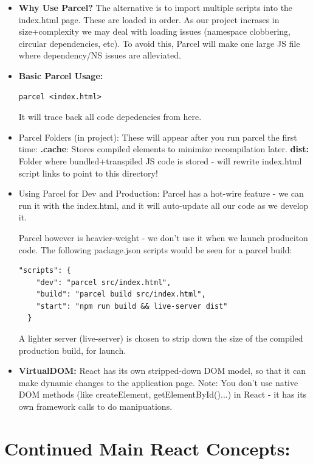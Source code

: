 \documentclass[8pt,a4paper]{extarticle}
\begin{document}
\begin{itemize}
\item \textbf{Why Use Parcel?} The alternative is to import multiple scripts into the index.html page. These are loaded in order. As our project incrases in size+complexity we may deal with loading issues (namespace clobbering, circular dependencies, etc). To avoid this, Parcel will make one large JS file where dependency/NS issues are alleviated.

\item \textbf{Basic Parcel Usage:}

\begin{verbatim}
parcel <index.html>
\end{verbatim}

It will trace back all code depedencies from here.
 
\item Parcel Folders (in project): These will appear after you run parcel the first time:
\mitem \textbf{.cache}: Stores compiled elements to minimize recompilation later.
\mitem \textbf{dist:} Folder where bundled+transpiled JS code is stored - will rewrite index.html script links to point to this directory!
\item Using Parcel for Dev and Production: Parcel has a hot-wire feature - we can run it with the index.html, and it will auto-update all our code as we develop it.

Parcel however is heavier-weight - we don't use it when we launch produciton code. The following package.json scripts would be seen for a parcel build:

\begin{verbatim}
"scripts": {
    "dev": "parcel src/index.html",
    "build": "parcel build src/index.html",
    "start": "npm run build && live-server dist"
  }
\end{verbatim}

A lighter server (live-server) is chosen to strip down the size of the compiled production build, for launch.

\item \textbf{VirtualDOM:} React has its own stripped-down DOM model, so that it can make dynamic changes to the application page. Note: You don't use native DOM methods (like createElement, getElementById()...) in React - it has its own framework calls to do manipuations.
\end{itemize}

\section*{Continued Main React Concepts:}
\end{document}
